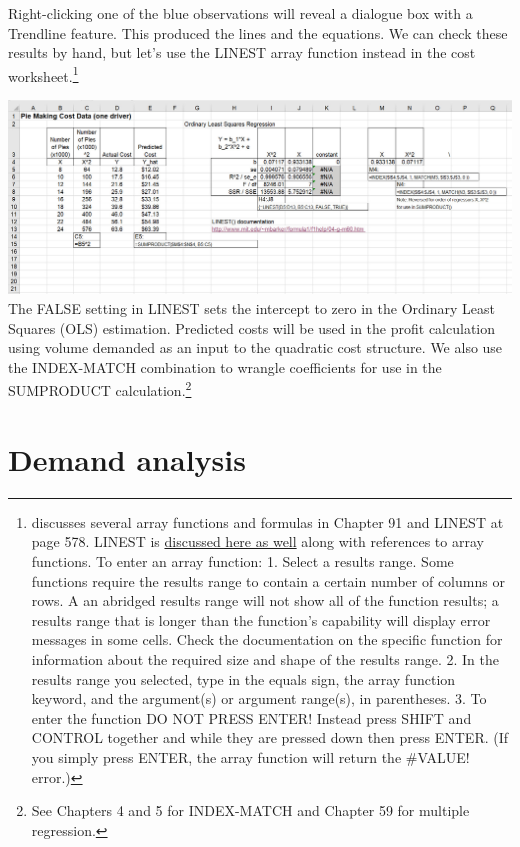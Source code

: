 \documentclass[
]{book}
\begin{document}
Right-clicking one of the blue observations will reveal a dialogue box with a Trendline feature. This produced the lines and the equations. We can check these results by hand, but let's use the LINEST array function instead in the cost worksheet.\footnote{\citet{Winston2019} discusses several array functions and formulas in Chapter 91 and LINEST at page 578. LINEST is \href{http://www.mit.edu/~mbarker/formula1/f1help/04-g-m60.htm}{discussed here as well} along with references to array functions. To enter an array function: 1. Select a results range. Some functions require the results range to contain a certain number of columns or rows. A an abridged results range will not show all of the function results; a results range that is longer than the function's capability will display error messages in some cells. Check the documentation on the specific function for information about the required size and shape of the results range. 2. In the results range you selected, type in the equals sign, the array function keyword, and the argument(s) or argument range(s), in parentheses. 3. To enter the function DO NOT PRESS ENTER! Instead press SHIFT and CONTROL together and while they are pressed down then press ENTER. (If you simply press ENTER, the array function will return the \#VALUE! error.)}

\includegraphics{images/01/pie-cost.jpg}
The FALSE setting in LINEST sets the intercept to zero in the Ordinary Least Squares (OLS) estimation. Predicted costs will be used in the profit calculation using volume demanded as an input to the quadratic cost structure. We also use the INDEX-MATCH combination to wrangle coefficients for use in the SUMPRODUCT calculation.\footnote{See \citet{Winston2019} Chapters 4 and 5 for INDEX-MATCH and Chapter 59 for multiple regression.}

\hypertarget{demand-analysis}{%
\section{Demand analysis}\label{demand-analysis}}
\end{document}
